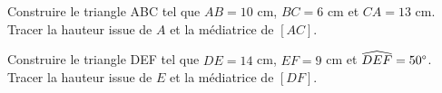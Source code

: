 \documentclass[a4paper,11pt]{exam}
\begin{document}
\begin{questions}
	\question[6] Construire le triangle ABC tel que $AB = 10$ cm, $BC = 6$ cm et $CA = 13$ cm. Tracer la hauteur issue de $A$ et la médiatrice de $[AC]$.
	
	\vspace*{10cm}
	
	\question[6] Construire le triangle DEF tel que $DE = 14$ cm, $EF = 9$ cm et $\widehat{DEF} = 50 \degree$. Tracer la hauteur issue de $E$ et la médiatrice de $[DF]$.
\end{questions}


\label{LastPage}
\end{document}
